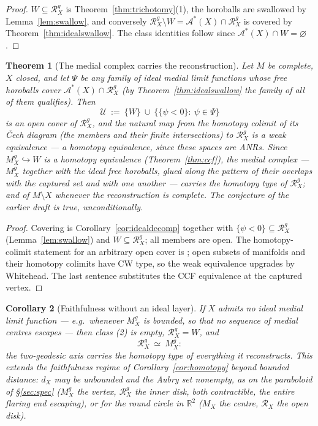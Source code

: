 \documentclass[11pt]{article}
\newtheorem{theorem}{Theorem}[section]
\newtheorem{corollary}[theorem]{Corollary}
\theoremstyle{remark}
\newcommand{\R}{\mathbb{R}}
\newcommand{\X}{X}
\newcommand{\Mx}{M_{\X}}
\newcommand{\Mg}{M^{g}_{\X}}
\newcommand{\Rx}{\mathcal{R}_{\X}}
\newcommand{\Rg}{\mathcal{R}^{g}_{\X}}
\newcommand{\dX}{d_{\X}}
\newcommand{\Aub}{\mathcal{A}^{\ast}}
\begin{document}
\begin{proof}
$W\subseteq\Rg$ is Theorem~\ref{thm:trichotomy}(1), the horoballs
are swallowed by Lemma~\ref{lem:swallow}, and conversely
$\Rg\setminus W=\Aub(\X)\cap\Rg$ is covered by
Theorem~\ref{thm:idealswallow}. The class identities follow since
$\Aub(\X)\cap W=\varnothing$.
\end{proof}

\begin{theorem}[The medial complex carries the reconstruction]
\label{thm:complex}
Let $M$ be complete, $\X$ closed, and let $\Psi$ be any family of
ideal medial limit functions whose free horoballs cover
$\Aub(\X)\cap\Rg$ (by Theorem~\ref{thm:idealswallow} the family of
\emph{all} of them qualifies). Then
\[
  \mathcal{U}\ :=\ \{W\}\ \cup\
  \bigl\{\{\psi<0\}:\ \psi\in\Psi\bigr\}
\]
is an open cover of $\Rg$, and the natural map from the homotopy
colimit of its \v{C}ech diagram (the members and their finite
intersections) to $\Rg$ is a weak equivalence \cite{DI} --- a
homotopy equivalence, since these spaces are ANRs. Since
$\Mg\hookrightarrow W$ is a homotopy equivalence
(Theorem~\ref{thm:ccf}), the \emph{medial complex} --- $\Mg$
together with the ideal free horoballs, glued along the pattern of
their overlaps with the captured set and with one another ---
carries the homotopy type of $\Rg$; and of $M\setminus\X$ whenever
the reconstruction is complete. The conjecture of the earlier draft
is true, unconditionally.
\end{theorem}

\begin{proof}
Covering is Corollary~\ref{cor:idealdecomp} together with
$\{\psi<0\}\subseteq\Rg$ (Lemma~\ref{lem:swallow}) and
$W\subseteq\Rg$; all members are open. The homotopy-colimit
statement for an arbitrary open cover is \cite{DI}; open subsets of
manifolds and their homotopy colimits have CW type, so the weak
equivalence upgrades by Whitehead. The last sentence substitutes the
CCF equivalence at the captured vertex.
\end{proof}

\begin{corollary}[Faithfulness without an ideal layer]
\label{cor:noideal}
If $\X$ admits no ideal medial limit function --- e.g.\ whenever
$\Mg$ is bounded, so that no sequence of medial centres escapes ---
then class \textup{(2)} is empty, $\Rg=W$, and
\[
  \Rg\ \simeq\ \Mg :
\]
the two-geodesic axis carries the homotopy type of everything it
reconstructs. This extends the faithfulness regime of
Corollary~\ref{cor:homotopy} beyond bounded distance: $\dX$ may be
unbounded and the Aubry set nonempty, as on the paraboloid of
\S\ref{sec:spec} ($\Mg$ the vertex, $\Rg$ the inner disk, both
contractible, the entire flaring end escaping), or for the round
circle in $\R^{2}$ ($\Mx$ the centre, $\Rx$ the open disk).
\end{corollary}
\end{document}
